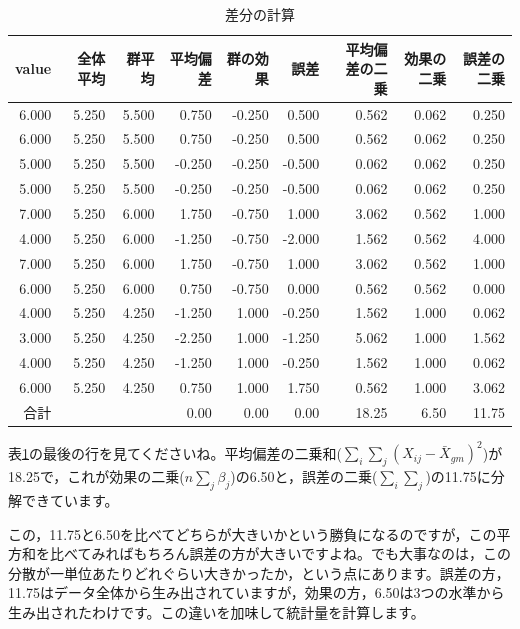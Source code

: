 \documentclass{ltjsarticle}
\begin{document}
\begin{table}[ht]
    \centering
    \caption{差分の計算} 
    \begin{tabular}{rrrrrrrrr}
      \hline
    value & 全体平均 & 群平均 & 平均偏差 & 群の効果 & 誤差 & 平均偏差の二乗 & 効果の二乗 & 誤差の二乗 \\ 
      \hline
    6.000 & 5.250 & 5.500 & 0.750 & -0.250 & 0.500 & 0.562 & 0.062 & 0.250 \\ 
      6.000 & 5.250 & 5.500 & 0.750 & -0.250 & 0.500 & 0.562 & 0.062 & 0.250 \\ 
      5.000 & 5.250 & 5.500 & -0.250 & -0.250 & -0.500 & 0.062 & 0.062 & 0.250 \\ 
      5.000 & 5.250 & 5.500 & -0.250 & -0.250 & -0.500 & 0.062 & 0.062 & 0.250 \\ 
      7.000 & 5.250 & 6.000 & 1.750 & -0.750 & 1.000 & 3.062 & 0.562 & 1.000 \\ 
      4.000 & 5.250 & 6.000 & -1.250 & -0.750 & -2.000 & 1.562 & 0.562 & 4.000 \\ 
      7.000 & 5.250 & 6.000 & 1.750 & -0.750 & 1.000 & 3.062 & 0.562 & 1.000 \\ 
      6.000 & 5.250 & 6.000 & 0.750 & -0.750 & 0.000 & 0.562 & 0.562 & 0.000 \\ 
      4.000 & 5.250 & 4.250 & -1.250 & 1.000 & -0.250 & 1.562 & 1.000 & 0.062 \\ 
      3.000 & 5.250 & 4.250 & -2.250 & 1.000 & -1.250 & 5.062 & 1.000 & 1.562 \\ 
      4.000 & 5.250 & 4.250 & -1.250 & 1.000 & -0.250 & 1.562 & 1.000 & 0.062 \\ 
      6.000 & 5.250 & 4.250 & 0.750 & 1.000 & 1.750 & 0.562 & 1.000 & 3.062 \\ 
       \hline\hline
       合計 & & &  0.00 & 0.00 & 0.00 & 18.25 & 6.50 & 11.75\\\hline
    \end{tabular}
    \label{tbl::21_04}
    \end{table}
表\ref{tbl::21_04}の最後の行を見てくださいね。平均偏差の二乗和($\sum_{i}\sum_{j} (X_{ij} - \bar{X}_{gm})^2$)が18.25で，これが効果の二乗($n\sum_j \beta_j$)の6.50と，誤差の二乗($ \sum_{i}\sum_{j} $)の11.75に分解できています。

この，11.75と6.50を比べてどちらが大きいかという勝負になるのですが，この平方和を比べてみればもちろん誤差の方が大きいですよね。でも大事なのは，この分散が一単位あたりどれぐらい大きかったか，という点にあります。誤差の方，11.75はデータ全体から生み出されていますが，効果の方，6.50は3つの水準から生み出されたわけです。この違いを加味して統計量を計算します。
\end{document}
